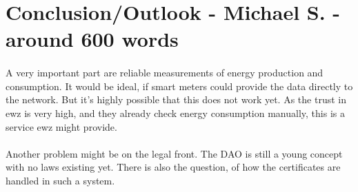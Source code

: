 \documentclass{scrartcl}
\begin{document}
    \section{Conclusion/Outlook - Michael S. - around 600 words}
	\paragraph{}
	A very important part are reliable measurements of energy production and consumption. It would be ideal, if smart meters could provide the data directly to the network. But it's highly possible that this does not work yet. As the trust in ewz is very high, and they already check energy consumption manually, this is a service ewz might provide.
	
    \paragraph{}
	Another problem might be on the legal front. The DAO is still a young concept with no laws existing yet. There is also the question, of how the certificates are handled in such a system.  
    
\end{document}

